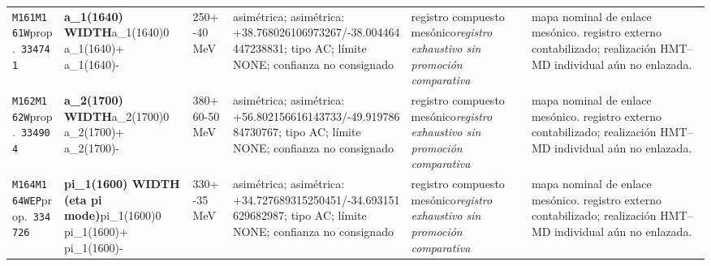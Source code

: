 \begin{landscape}
\begin{longtable}{L{1.85cm}L{4.45cm}L{2.35cm}L{4.05cm}L{3.35cm}L{7.15cm}}
\texttt{M161}\newline \texttt{M161W}\newline prop.\ \texttt{334741} & \textbf{a\_\allowbreak{}1(1640) WIDTH}\newline a\_\allowbreak{}1(1640)0 \textbar{}\allowbreak{} a\_\allowbreak{}1(1640)+ \textbar{}\allowbreak{} a\_\allowbreak{}1(1640)- & 250+-40\,MeV & asimétrica; asimétrica: +38.768026106973267/-38.004464447238831; tipo AC; límite NONE; confianza no consignado & registro compuesto mesónico\newline \emph{registro exhaustivo sin promoción comparativa} & mapa nominal de enlace mesónico. registro externo contabilizado; realización HMT--MD individual aún no enlazada. \\
\texttt{M162}\newline \texttt{M162W}\newline prop.\ \texttt{334904} & \textbf{a\_\allowbreak{}2(1700) WIDTH}\newline a\_\allowbreak{}2(1700)0 \textbar{}\allowbreak{} a\_\allowbreak{}2(1700)+ \textbar{}\allowbreak{} a\_\allowbreak{}2(1700)- & 380+60-50\,MeV & asimétrica; asimétrica: +56.802156616143733/-49.91978684730767; tipo AC; límite NONE; confianza no consignado & registro compuesto mesónico\newline \emph{registro exhaustivo sin promoción comparativa} & mapa nominal de enlace mesónico. registro externo contabilizado; realización HMT--MD individual aún no enlazada. \\
\texttt{M164}\newline \texttt{M164WEP}\newline prop.\ \texttt{334726} & \textbf{pi\_\allowbreak{}1(1600) WIDTH (eta pi mode)}\newline pi\_\allowbreak{}1(1600)0 \textbar{}\allowbreak{} pi\_\allowbreak{}1(1600)+ \textbar{}\allowbreak{} pi\_\allowbreak{}1(1600)- & 330+-35\,MeV & asimétrica; asimétrica: +34.727689315250451/-34.693151629682987; tipo AC; límite NONE; confianza no consignado & registro compuesto mesónico\newline \emph{registro exhaustivo sin promoción comparativa} & mapa nominal de enlace mesónico. registro externo contabilizado; realización HMT--MD individual aún no enlazada. \\

\end{longtable}
\end{landscape}
